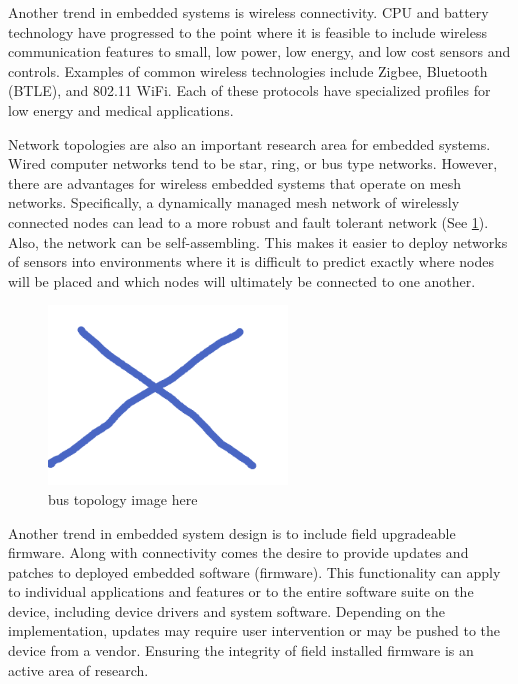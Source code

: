 \documentclass[final,conference,10pt]{IEEEtran}
\begin{document}
Another trend in embedded systems is wireless connectivity.  CPU and battery technology have progressed to the point where it is feasible to include wireless communication features to small, low power, low energy, and low cost sensors and controls.  Examples of common wireless technologies include Zigbee, Bluetooth (BTLE), and 802.11 WiFi.  Each of these protocols have specialized profiles for low energy and medical applications.

Network topologies are also an important research area for embedded systems.  Wired computer networks tend to be star, ring, or bus type networks.  However, there are advantages for wireless embedded systems that operate on mesh networks.  Specifically, a dynamically managed mesh network of wirelessly connected nodes can lead to a more robust and fault tolerant network (See \figurename \ref{fig:topology}).  Also, the network can be self-assembling.  This makes it easier to deploy networks of sensors into environments where it is difficult to predict exactly where nodes will be placed and which nodes will ultimately be connected to one another.\cite{Vasserman2013}

\begin{figure}[!t]
\centering
\includegraphics[width=2.5in]{topology}
\caption{bus topology image here}
\label{fig:topology}
\end{figure}

Another trend in embedded system design is to include field upgradeable firmware.  Along with connectivity comes the desire to provide updates and patches to deployed embedded software (firmware).  This functionality can apply to individual applications and features or to the entire software suite on the device, including device drivers and system software.  Depending on the implementation, updates may require user intervention or may be pushed to the device from a vendor.  Ensuring the integrity of field installed firmware is an active area of research.
\end{document}
